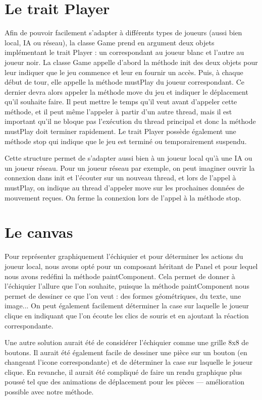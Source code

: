 \documentclass[11pt]{article}
\begin{document}
\section{Le trait Player}

Afin de pouvoir facilement s'adapter à différents types de joueurs (aussi bien local, IA ou réseau), la classe Game prend en argument deux objets implémentant le trait Player : un correspondant au joueur blanc et l'autre au joueur noir.
La classe Game appelle d'abord la méthode init des deux objets pour leur indiquer que le jeu commence et leur en fournir un accès.
Puis, à chaque début de tour, elle appelle la méthode mustPlay du joueur correspondant. Ce dernier devra alors appeler la méthode move du jeu et indiquer le déplacement qu'il souhaite faire. Il peut mettre le temps qu'il veut avant d'appeler cette méthode, et il peut même l'appeler à partir d'un autre thread, mais il est important qu'il ne bloque pas l'exécution du thread principal et donc la méthode mustPlay doit terminer rapidement.
Le trait Player possède également une méthode stop qui indique que le jeu est terminé ou temporairement suspendu.\newline

Cette structure permet de s'adapter aussi bien à un joueur local qu'à une IA ou un joueur réseau. Pour un joueur réseau par exemple, on peut imaginer ouvrir la connexion dans init et l'écouter sur un nouveau thread, et lors de l'appel à mustPlay, on indique au thread d'appeler move sur les prochaines données de mouvement reçues. On ferme la connexion lors de l'appel à la méthode stop.

\section{Le canvas}

Pour représenter graphiquement l'échiquier et pour déterminer les actions du joueur local, nous avons opté pour un composant héritant de Panel et pour lequel nous avons redéfini la méthode paintComponent. Cela permet de donner à l'échiquier l'allure que l'on souhaite, puisque la méthode paintComponent nous permet de dessiner ce que l'on veut : des formes géométriques, du texte, une image... On peut également facilement déterminer la case sur laquelle le joueur clique en indiquant que l'on écoute les clics de souris et en ajoutant la réaction correspondante.\newline

Une autre solution aurait été de considérer l'échiquier comme une grille 8x8 de boutons. Il aurait été également facile de dessiner une pièce sur un bouton (en changeant l'icone correspondante) et de déterminer la case sur laquelle le joueur clique. En revanche, il aurait été compliqué de faire un rendu graphique plus poussé tel que des animations de déplacement pour les pièces — amélioration possible avec notre méthode.
\end{document}
